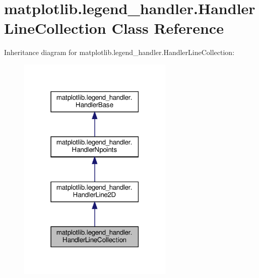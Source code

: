 \hypertarget{classmatplotlib_1_1legend__handler_1_1HandlerLineCollection}{}\section{matplotlib.\+legend\+\_\+handler.\+Handler\+Line\+Collection Class Reference}
\label{classmatplotlib_1_1legend__handler_1_1HandlerLineCollection}


Inheritance diagram for matplotlib.\+legend\+\_\+handler.\+Handler\+Line\+Collection\+:
\nopagebreak
\begin{figure}[H]
\begin{center}
\leavevmode
\includegraphics[width=210pt]{classmatplotlib_1_1legend__handler_1_1HandlerLineCollection__inherit__graph}
\end{center}
\end{figure}


